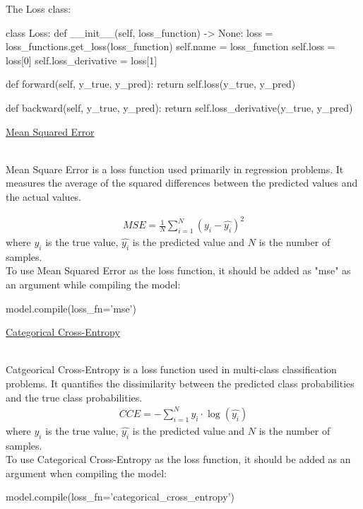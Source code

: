 \documentclass{article}
\begin{document}
    The Loss class:
\begin{python}
class Loss:
    def __init__(self, loss_function) -> None:
        loss = loss_functions.get_loss(loss_function)
        self.name = loss_function
        self.loss = loss[0]
        self.loss_derivative = loss[1]

    def forward(self, y_true, y_pred):
        return self.loss(y_true, y_pred)

    def backward(self, y_true, y_pred):
        return self.loss_derivative(y_true, y_pred)
\end{python}
    \pagebreak

    \hypertarget{mse}{\underline{Mean Squared Error}} \\

    Mean Square Error is a loss function used primarily in regression
    problems. It measures the average of the squared differences
    between the predicted values and the actual values.

    \begin{align*}
        MSE = \frac{1}{N} \sum_{i=1}^{N} (y_{i} - \hat{y_{i}})^{2}
    \end{align*}
    where $y_{i}$ is the true value, $\hat{y_{i}}$ is the predicted value
    and $N$ is the number of samples.\\

    To use Mean Squared Error as the loss function, it should be added as "mse" as an argument
    while compiling the model:
\begin{python}
model.compile(loss_fn='mse')
\end{python}
    \pagebreak

    \hypertarget{cce}{\underline{Categorical Cross-Entropy}} \\

    Catgeorical Cross-Entropy is a loss function used in multi-class 
    classification problems. It quantifies the dissimilarity between 
    the predicted class probabilities and the true class 
    probabilities.
    \begin{align*}
        CCE = -\sum_{i=1}^{N} y_{i} \cdot \log{(\hat{y_{i}})}
    \end{align*}
    where $y_{i}$ is the true value, $\hat{y_{i}}$ is the predicted value
    and $N$ is the number of samples. \\

    To use Categorical Cross-Entropy as the loss function, it should be added as an argument
    when compiling the model:
\begin{python}
model.compile(loss_fn='categorical_cross_entropy')
\end{python}
\end{document}
